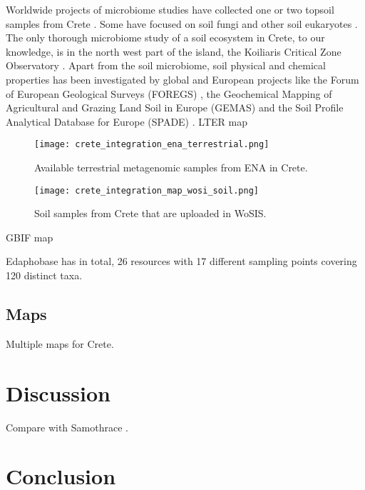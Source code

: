 Worldwide projects of microbiome studies have collected one or two topsoil
samples from Crete \parencite{Vasar2022, Labouyrie2023, Bahram2018, Orgiazzi2018}.
Some have focused on soil fungi \parencite{Mikryukov2023, Davison2021, Tedersoo2021}
and other soil eukaryotes \parencite{Aslani2022}.
The only thorough microbiome study of a soil ecosystem in Crete, to our knowledge,
is in the north west part of the island, the Koiliaris Critical Zone Observatory \parencite{tsiknia2014}.
Apart from the soil microbiome, soil physical and chemical properties has been
investigated by global and European projects like the Forum of European Geological Surveys
(FOREGS) \parencite{nerc19017}, the Geochemical Mapping of Agricultural and Grazing Land
Soil in Europe (GEMAS) \parencite{REIMANN2018302} and the Soil Profile Analytical
Database for Europe (SPADE) \parencite{Hiederer2006}.
LTER map

\begin{figure}[h] 
    \centering\texttt{[image: crete\_integration\_ena\_terrestrial.png]}
    \caption{Available terrestrial metagenomic samples from ENA in Crete.}
    \label{fig:isd_crete_ena}
\end{figure}


\begin{figure}[h] 
    \centering\texttt{[image: crete\_integration\_map\_wosi\_soil.png]}
    \caption{Soil samples from Crete that are uploaded in WoSIS.}
    \label{fig:isd_crete_wosis}
\end{figure}

GBIF map 

Edaphobase has in total, 26 resources with 17 different sampling points covering 120 distinct taxa.



\subsection{Maps}

Multiple maps for Crete.


\section{Discussion}\label{crete_idea_discussion}

Compare with Samothrace \parencite{noll2024insights}.

\section{Conclusion}

